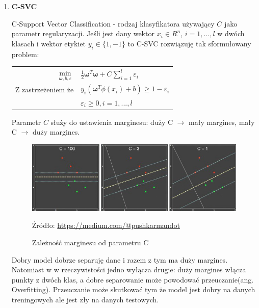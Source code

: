 \documentclass[paper=a4, fontsize=11pt]{scrartcl} %
\numberwithin{equation}{section} %
\numberwithin{figure}{section} %
\newcommand*{\captionsource}[2]{%
  \caption[{#1}]{%
      #1}
    Źródło: #2%
}
\begin{document}
\begin{enumerate}
    \item \textbf{C-SVC}
    \par C-Support Vector Classification - rodzaj klasyfikatora używający $C$ jako 
    parametr regularyzacji. Jeśli jest dany wektor $x_i \in R^n$, $i=1,...,l$ 
    w dwóch klasach i wektor etykiet $y_i \in \{1, -1\}$ to C-SVC rozwiązuję tak
    sformułowany problem:

    \begin{center}
        \begin{tabular}{rl}
            $\min\limits_{\pmb{\omega}, b, \varepsilon}$ & $\frac{1}{2} \pmb{\omega} ^T \pmb{\omega} +
            C \sum\limits_{i=1}^{l}\varepsilon_i$ \\
            Z zastrzeżeniem że & $y_i(\pmb{\omega}^T\phi(x_i) + b) \geq 1 - \varepsilon_i$ \\
                               & $\varepsilon_i \geq 0,i=1,...,l$
        \end{tabular}
    \end{center}

    \par Parametr $C$ służy do ustawienia marginesu: duży C $\rightarrow$ mały margines,
    mały C $\rightarrow$ duży margines.

    \begin{figure}[H]
        \begin{center}
            \includegraphics[scale=0.8]{./img/param_c.png}
            \captionsource{Zależność marginesu od parametru C}{\url{https://medium.com/@pushkarmandot}}
            \label{fig:param_c}
        \end{center}
    \end{figure}

    \par Dobry model dobrze separuję dane i razem z tym ma duży margines. Natomiast w
    w rzeczywistości jedno wyłącza drugie: duży margines włącza punkty z dwóch klas, a
    dobre separowanie może powodować przeuczanie(ang. Overfitting). Przeuczanie może 
    skutkować tym że model jest dobry na danych treningowych ale jest zły na danych testowych.


\end{enumerate}
\end{document}
